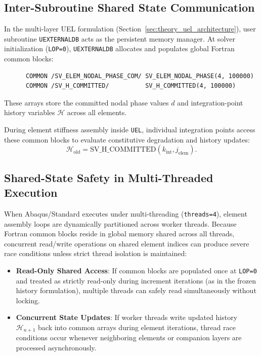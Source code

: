 \subsection{Inter-Subroutine Shared State Communication}
In the multi-layer UEL formulation (Section~\ref{sec:theory_uel_architecture}), user subroutine \texttt{UEXTERNALDB} acts as the persistent memory manager. At solver initialization (\texttt{LOP=0}), \texttt{UEXTERNALDB} allocates and populates global Fortran common blocks:
\begin{verbatim}
      COMMON /SV_ELEM_NODAL_PHASE_COM/ SV_ELEM_NODAL_PHASE(4, 100000)
      COMMON /SV_H_COMMITTED/          SV_H_COMMITTED(4, 100000)
\end{verbatim}
These arrays store the committed nodal phase values $d$ and integration-point history variables $\mathcal{H}$ across all elements.

During element stiffness assembly inside \texttt{UEL}, individual integration points access these common blocks to evaluate constitutive degradation and history updates:
\begin{equation}
\mathcal{H}_{\mathrm{old}} = \text{SV\_H\_COMMITTED}(k_{\mathrm{int}}, j_{\mathrm{elem}}).
\end{equation}

\subsection{Shared-State Safety in Multi-Threaded Execution}
When Abaqus/Standard executes under multi-threading (\texttt{threads=4}), element assembly loops are dynamically partitioned across worker threads. Because Fortran common blocks reside in global memory shared across all threads, concurrent read/write operations on shared element indices can produce severe race conditions unless strict thread isolation is maintained:
\begin{itemize}
    \item \textbf{Read-Only Shared Access}: If common blocks are populated once at \texttt{LOP=0} and treated as strictly read-only during increment iterations (as in the frozen history formulation), multiple threads can safely read simultaneously without locking.
    \item \textbf{Concurrent State Updates}: If worker threads write updated history $\mathcal{H}_{n+1}$ back into common arrays during element iterations, thread race conditions occur whenever neighboring elements or companion layers are processed asynchronously.
\end{itemize}

